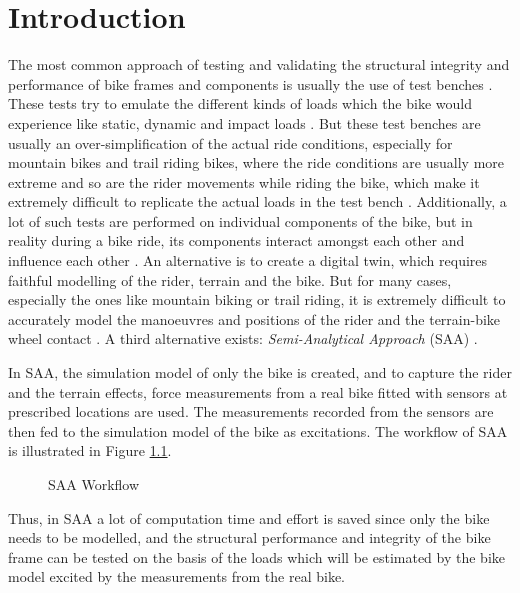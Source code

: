 \changefontsizes{20pt}
\chapter{Introduction} 
\label{cha:einleitung}
\changefontsizes{12pt}
The most common approach of testing and validating the structural integrity and performance of bike frames and components is usually the use of test benches \cite{FS07,Jac17}. These tests try to emulate the different kinds of loads which the bike would experience like static, dynamic and impact loads \cite{Bru10,FS07,HHS11,Wol20}. But these test benches are usually an over-simplification of the actual ride conditions, especially for mountain bikes and trail riding bikes, where the ride conditions are usually more extreme and so are the rider movements while riding the bike, which make it extremely difficult to replicate the actual loads in the test bench \cite{Jac17,BS10,CAD16,HHS11}. Additionally, a lot of such tests are performed on individual components of the bike, but in reality during a bike ride, its components interact amongst each other and influence each other \cite{Bru10}. An alternative is to create a digital twin, which requires faithful modelling of the rider, terrain and the bike. But for many cases, especially the ones like mountain biking or trail riding, it is extremely difficult to accurately model the manoeuvres and positions of the rider \cite{MPR07,SM13} and the terrain-bike wheel contact \cite{DTC13,KSM08,Red05}. A third alternative exists: \emph{Semi-Analytical Approach} (SAA) \cite{MX14,RTV19}.  

In SAA, the simulation model of only the bike is created, and to capture the rider and the terrain effects, force measurements from a real bike fitted with sensors at prescribed locations are used. The measurements recorded from the sensors are then fed to the simulation model of the bike as excitations. The workflow of SAA is illustrated in Figure \ref{fig:SAA}.

\begin{figure}[h!]
	\centering
	
\caption{SAA Workflow}
\label{fig:SAA}
\end{figure} 



Thus, in SAA a lot of computation time and effort is saved since only the bike needs to be modelled, and the structural performance and integrity of the bike frame can be tested on the basis of the loads which will be estimated by the bike model excited by the measurements from the real bike.  